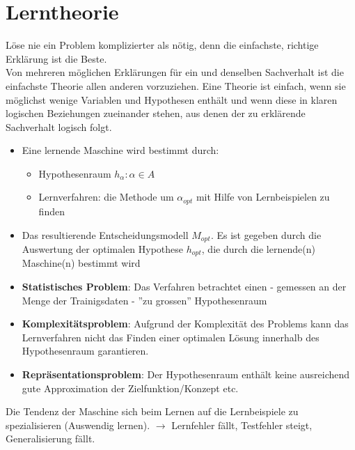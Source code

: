\chapter{Lerntheorie}

Löse nie ein Problem komplizierter als nötig, denn die einfachste, richtige Erklärung
ist die Beste.\\
Von mehreren möglichen Erklärungen für ein und denselben Sachverhalt ist die einfachste
Theorie allen anderen vorzuziehen. Eine Theorie ist einfach, wenn sie möglichst
wenige Variablen und Hypothesen enthält und wenn diese in klaren logischen
Beziehungen zueinander stehen, aus denen der zu erklärende Sachverhalt logisch folgt.

\begin{itemize}
    \item Eine lernende Maschine wird bestimmt durch:
    \begin{itemize}
        \item Hypothesenraum ${h_\alpha : \alpha \in A}$
        \item Lernverfahren: die Methode um $\alpha_{opt}$ mit Hilfe von
        Lernbeispielen zu finden
    \end{itemize}
    \item Das resultierende Entscheidungsmodell $M_{opt}$. Es ist gegeben durch die Auswertung
    der optimalen Hypothese $h_{opt}$, die durch die lernende(n) Maschine(n) bestimmt wird
\end{itemize}


\begin{itemize}
    \item \textbf{Statistisches Problem}: Das Verfahren betrachtet einen -
    gemessen an der Menge der Trainigsdaten - ''zu grossen'' Hypothesenraum
    \item \textbf{Komplexitätsproblem}: Aufgrund der Komplexität des Problems kann
    das Lernverfahren nicht das Finden einer optimalen Lösung innerhalb des
    Hypothesenraum garantieren.
    \item \textbf{Repräsentationsproblem}: Der Hypothesenraum enthält keine ausreichend
    gute Approximation der Zielfunktion/Konzept etc.
\end{itemize}

Die Tendenz der Maschine sich beim Lernen auf die Lernbeispiele zu spezialisieren
(Auswendig lernen). $\rightarrow$ Lernfehler fällt, Testfehler steigt, Generalisierung fällt.\\

